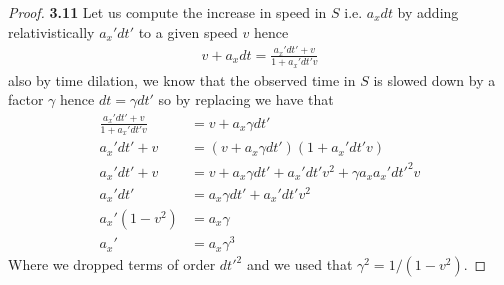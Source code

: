 \documentclass[11pt]{article}
\theoremstyle{definition}
\begin{document}
\begin{proof}{\textbf{3.11}}
    Let us compute the increase in speed in $S$ i.e. $a_x dt$ by adding
    relativistically  $a_x'dt'$ to a given speed $v$ hence
    \begin{align*}
        v + a_x dt = \frac{a_x' dt' + v}{1 + a_x' dt' v}
    \end{align*}
    also by time dilation, we know that the observed time in $S$ is slowed down
    by a factor $\gamma$ hence $dt = \gamma dt'$ so by replacing we have that
    \begin{align*}
        \frac{a_x' dt' + v}{1 + a_x' dt' v} &= v + a_x \gamma dt'\\
        a_x' dt' + v &= (v + a_x \gamma dt')(1 + a_x' dt' v)\\
        a_x' dt' + v &=
        v + a_x \gamma dt' + a_x' dt' v^2 + \gamma a_x a_x' dt'^2 v\\
        a_x' dt' &= a_x \gamma dt' + a_x' dt' v^2\\
        a_x' (1 - v^2) &= a_x \gamma\\
        a_x' &= a_x \gamma^3
    \end{align*}
    Where we dropped terms of order $dt'^2$ and we used that
    $\gamma^2 = 1/(1-v^2)$.
\end{proof}
\cleardoublepage
\end{document}
